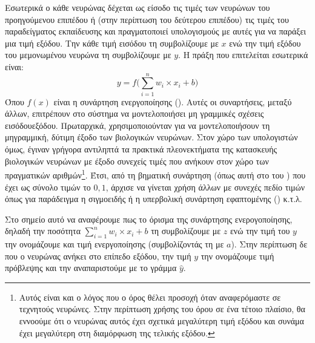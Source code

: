 Εσωτερικά ο κάθε νευρώνας δέχεται ως είσοδο τις τιμές των νευρώνων του προηγούμενου επιπέδου ή (στην περίπτωση του δεύτερου επιπέδου) τις τιμές του παραδείγματος εκπαίδευσης και πραγματοποιεί υπολογισμούς με αυτές για να παράξει μια τιμή εξόδου. Την κάθε τιμή εισόδου τη συμβολίζουμε με $x$ ενώ την τιμή εξόδου του μεμονωμένου νευρώνα τη συμβολίζουμε με $y$. Η πράξη που επιτελείται εσωτερικά είναι:
\begin{equation}
y = f\Big(\sum_{i = 1}^{n} w_i \times x_i  +  b\Big)
\end{equation}
Όπου $f(x)$ είναι η συνάρτηση ενεργοποίησης (). Αυτές οι συναρτήσεις, μεταξύ άλλων, επιτρέπουν στο σύστημα να μοντελοποιήσει μη γραμμικές σχέσεις εισόδου\textendash εξόδου. Πρωταρχικά, χρησιμοποιούνταν για να μοντελοποιήσουν τη μη\textendash γραμμική, δύτιμη έξοδο των βιολογικών νευρώνων. Στον χώρο των υπολογιστών όμως, έγιναν γρήγορα αντιληπτά τα πρακτικά πλεονεκτήματα της κατασκευής βιολογικών νευρώνων με έξοδο συνεχείς τιμές που ανήκουν στον χώρο των πραγματικών αριθμών\footnote{Αυτός είναι και ο λόγος που ο όρος  θέλει προσοχή όταν αναφερόμαστε σε τεχνητούς νευρώνες. Στην περίπτωση χρήσης του όρου σε ένα τέτοιο πλαίσιο, θα εννοούμε ότι ο νευρώνας αυτός έχει σχετικά μεγαλύτερη τιμή εξόδου και συνάμα έχει μεγαλύτερη  στη διαμόρφωση της τελικής εξόδου.}. Έτσι, από τη βηματική συνάρτηση (όπως αυτή στο  του  \cite{rosenblatt1958perceptron}) που έχει ως σύνολο τιμών το ${0,1}$, άρχισε να γίνεται χρήση άλλων με συνεχές πεδίο τιμών όπως για παράδειγμα η σιγμοειδής ή η υπερβολική συνάρτηση εφαπτομένης () κ.τ.λ. \par

Στο σημείο αυτό να αναφέρουμε πως το όρισμα της συνάρτησης ενερογοποίησης, δηλαδή την ποσότητα \(\sum_{i = 1}^{n} w_i \times x_i  +  b\) τη συμβολίζουμε με $z$ ενώ την τιμή του $y$ την ονομάζουμε και τιμή ενεργοποίησης (συμβολίζοντάς τη με $a$). Στην περίπτωση δε που ο νευρώνας ανήκει στο επίπεδο εξόδου, την τιμή $y$ την ονομάζουμε τιμή πρόβλεψης και την αναπαριστούμε με το γράμμα $\hat{y}$. \par

